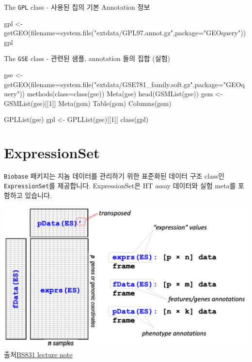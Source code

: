 \documentclass[
]{book}
\newenvironment{Shaded}{\begin{snugshade}}{\end{snugshade}}
\newcommand{\AttributeTok}[1]{\textcolor[rgb]{0.77,0.63,0.00}{#1}}
\newcommand{\DecValTok}[1]{\textcolor[rgb]{0.00,0.00,0.81}{#1}}
\newcommand{\FunctionTok}[1]{\textcolor[rgb]{0.00,0.00,0.00}{#1}}
\newcommand{\NormalTok}[1]{#1}
\newcommand{\OtherTok}[1]{\textcolor[rgb]{0.56,0.35,0.01}{#1}}
\newcommand{\StringTok}[1]{\textcolor[rgb]{0.31,0.60,0.02}{#1}}
\begin{document}
The \texttt{GPL} class - 사용된 칩의 기본 Annotation 정보

\begin{Shaded}
\begin{Highlighting}[]
\NormalTok{gpl }\OtherTok{\textless{}{-}} \FunctionTok{getGEO}\NormalTok{(}\AttributeTok{filename=}\FunctionTok{system.file}\NormalTok{(}\StringTok{"extdata/GPL97.annot.gz"}\NormalTok{,}\AttributeTok{package=}\StringTok{"GEOquery"}\NormalTok{))}
\NormalTok{gpl}
\end{Highlighting}
\end{Shaded}

The \texttt{GSE} class - 관련된 샘플, annotation 들의 집합 (실험)

\begin{Shaded}
\begin{Highlighting}[]
\NormalTok{gse }\OtherTok{\textless{}{-}} \FunctionTok{getGEO}\NormalTok{(}\AttributeTok{filename=}\FunctionTok{system.file}\NormalTok{(}\StringTok{"extdata/GSE781\_family.soft.gz"}\NormalTok{,}\AttributeTok{package=}\StringTok{"GEOquery"}\NormalTok{))}
\FunctionTok{methods}\NormalTok{(}\AttributeTok{class=}\FunctionTok{class}\NormalTok{(gse))}
\FunctionTok{Meta}\NormalTok{(gse)}
\FunctionTok{head}\NormalTok{(}\FunctionTok{GSMList}\NormalTok{(gse))}
\NormalTok{gsm }\OtherTok{\textless{}{-}} \FunctionTok{GSMList}\NormalTok{(gse)[[}\DecValTok{1}\NormalTok{]]}
\FunctionTok{Meta}\NormalTok{(gsm)}
\FunctionTok{Table}\NormalTok{(gsm)}
\FunctionTok{Columns}\NormalTok{(gsm)}


\FunctionTok{GPLList}\NormalTok{(gse)}
\NormalTok{gpl }\OtherTok{\textless{}{-}} \FunctionTok{GPLList}\NormalTok{(gse)[[}\DecValTok{1}\NormalTok{]]}
\FunctionTok{class}\NormalTok{(gpl)}
\end{Highlighting}
\end{Shaded}

\hypertarget{expressionset}{%
\section{ExpressionSet}\label{expressionset}}

\texttt{Biobase} 패키지는 지놈 데이터를 관리하기 위한 표준화된 데이터 구조 class인 \texttt{ExpressionSet}를 제공합니다. ExpressionSet은 HT assay 데이터와 실험 meta를 포함하고 있습니다.

\includegraphics[width=6.25in,height=\textheight]{images/12/ExpressionSet.png}
출처\href{https://montilab.github.io/BS831/articles/docs/ExpressionSet.html}{BS831 lecture note}
\end{document}
